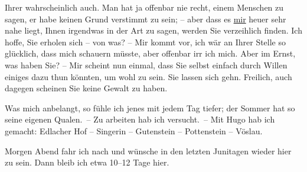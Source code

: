                Ihrer wahrscheinlich auch. Man hat ja offenbar nie recht, einem Menschen zu sagen, er
               habe keinen Grund verstimmt zu sein; – aber dass es \uline{mir} heuer sehr nahe liegt, Ihnen irgendwas in der Art zu sagen, werden Sie
               verzeihlich finden. Ich hoffe, Sie erholen sich – von was? – Mir kommt vor, ich wär
               an Ihrer Stelle so glücklich, dass mich schauern müsste, aber offenbar irr ich mich.
               Aber im Ernst, was haben Sie? – Mir scheint nun einmal, dass Sie selbst einfach durch
               Willen einiges dazu thun könnten, um wohl zu sein. Sie lassen sich gehn. Freilich,
               auch dagegen scheinen Sie keine Gewalt zu haben.\pend
           
\pstart
           Was mich anbelangt, so fühle ich jenes \label{K_L00928-1v}\label{K_L00928-1} mit {\pb}jedem Tag tiefer; der Sommer
               hat so seine eigenen Qualen. – Zu arbeiten hab ich versucht. – Mit Hugo hab ich \label{K_L00928-2v}\label{K_L00928-2}
               gemacht: Edlacher Hof – Singerin – Gutenstein – Pottenstein – Vöslau.\pend
           
\pstart
           Morgen Abend fahr ich nach \label{K_L00928-3v}\label{K_L00928-3} und wünsche in den
               letzten Junitagen wieder hier zu sein. Dann bleib ich etwa 10–12 Tage
               hier.\pend
           
